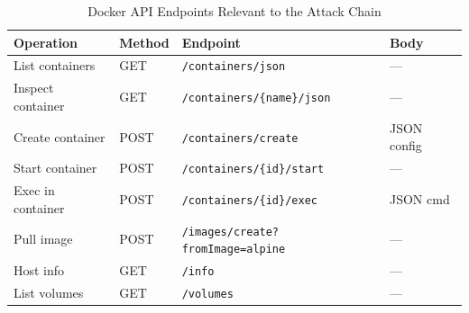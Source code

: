 \begin{table}[h]
\centering
\caption{Docker API Endpoints Relevant to the Attack Chain}
\label{tab:api-endpoints}
\begin{tabular}{|l|l|l|l|}
\hline
\textbf{Operation}        & \textbf{Method} & \textbf{Endpoint}                          & \textbf{Body}      \\
\hline
List containers           & GET             & \texttt{/containers/json}                  & ---                \\
Inspect container         & GET             & \texttt{/containers/\{name\}/json}         & ---                \\
Create container          & POST            & \texttt{/containers/create}                & JSON config        \\
Start container           & POST            & \texttt{/containers/\{id\}/start}          & ---                \\
Exec in container         & POST            & \texttt{/containers/\{id\}/exec}           & JSON cmd           \\
Pull image                & POST            & \texttt{/images/create?fromImage=alpine}   & ---                \\
Host info                 & GET             & \texttt{/info}                             & ---                \\
List volumes              & GET             & \texttt{/volumes}                          & ---                \\
\hline
\end{tabular}
\end{table}

